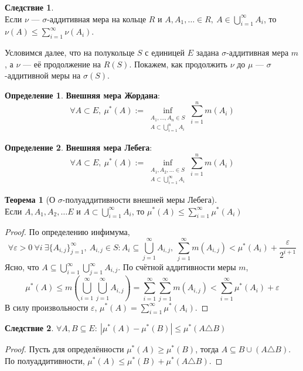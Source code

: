 \documentclass[11pt,a4paper]{report}
\def\eps{\varepsilon}
\theoremstyle{definition}
\theoremstyle{definition}
\newtheorem{theorem}{Теорема}[section]
\newtheorem{corollary}{Следствие}[section]
\theoremstyle{definition}
\newtheorem{definition}{Определение}[section]
\begin{document}
	\begin{corollary}$  $\\
		Если $ \nu $ — $ \sigma $-аддитивная мера на кольце $ R $ и $ A, A_{1}, \dots \in R,\ A \in \bigcup_{i=1}^{\infty}{A_{i}} $, то $ \nu(A) \le \sum_{i=1}^{\infty}{\nu(A_{i})} $.
	\end{corollary}
	\noindent Условимся далее, что на полукольце $ S $ с единицей $ E $ задана $ \sigma $-аддитивная мера $ m $, а $ \nu $ — её продолжение на $ R(S) $. Покажем, как продолжить $ \nu $ до $ \mu $ — $ \sigma $-аддитивной меры на $ \sigma(S) $.
	\begin{definition}
		\textbf{Внешняя мера Жордана}:
		\[ \forall A \subset E,\ \mu^{*}(A) := \inf_{\substack{A_{1}, \dots, A_{n} \in S\\A\subset\bigcup_{i=1}^{n}{A_{i}}}}{\sum_{i=1}^{n}{m(A_{i})}} \]
	\end{definition}
	\begin{definition}
		\textbf{Внешняя мера Лебега}:
		\[ \forall A \subset E,\ \mu^{*}(A) := \inf_{\substack{A_{1}, A_{2}, \dots \in S\\A\subset\bigcup_{i=1}^{\infty}{A_{i}}}}{\sum_{i=1}^{n}{m(A_{i})}} \]
	\end{definition}
	\begin{theorem}[О $ \sigma $-полуаддитивности внешней меры Лебега]$  $\\
		Если $ A, A_{1}, A_{2}, \dots E $ и $ A \subset \bigcup_{i=1}^{\infty}{A_{i}} $, то $ \mu^{*}(A) \le \sum_{i=1}^{\infty}{\mu^{*}(A_{i})} $
	\end{theorem}
	\begin{proof}
		По определению инфимума, 
		\[ \forall \eps > 0\ \forall i\ \exists \{A_{i, j}\}_{j=1}^{\infty},\ A_{i, j} \in S: A_{i} \subseteq \bigcup_{j=1}^{\infty}{A_{i, j}},\ \sum_{j=1}^{\infty}{m(A_{i, j})} < \mu^{*}(A_{i}) + \frac{\eps}{2^{i+1}} \]
		Ясно, что $ A \subseteq \bigcup_{i=1}^{\infty}{\bigcup_{j=1}^{\infty}{A_{i, j}}} $. По счётной аддитивности меры $ m $, 
		\[ \mu^{*}(A) \le m\left (\bigcup_{i=1}^{\infty}{\bigcup_{j=1}^{\infty}{A_{i, j}}}\right ) = \sum_{i=1}^{\infty}{\sum_{j=1}^{\infty}{m(A_{i, j})}} < \sum_{i=1}^{\infty}{\mu^{*}(A_{i})} + \eps \]
		В силу произвольности $ \eps $, $ \mu^{*}(A) = \sum_{i=1}^{\infty}{\mu^{*}(A_{i})} $.
	\end{proof}
	\begin{corollary}
		$ \forall A, B \subseteq E:\ |\mu^{*}(A) - \mu^{*}(B)| \le \mu^{*}(A \triangle B) $
	\end{corollary}
	\begin{proof}
		Пусть для определённости $ \mu^{*}(A) \ge \mu^{*}(B) $, тогда $ A \subseteq B \cup (A \triangle B) $.\\ 
		По полуаддитивности, $ \mu^{*}(A) \le \mu^{*}(B) + \mu^{*}(A \triangle B) $.
	\end{proof}
\end{document}

